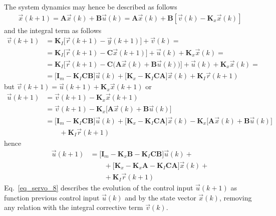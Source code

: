 \documentclass[12pt,a4paper,oneside]{book}
\begin{document}
\begin{onehalfspace}
The system dynamics may hence be described as follows
\begin{equation}\label{eq_servo_6}
	\begin{aligned}
		\vec{x}(k+1) = \mathbf{A}\vec{x}(k)+\mathbf{B}\vec{u}(k) = 
		\mathbf{A}\vec{x}(k)+\mathbf{B}\left[ 
		\vec{v}(k)-\mathbf{K}_x\vec{x}(k)\right] 
	\end{aligned}
\end{equation}
and the integral term as follows
\begin{equation}\label{eq_servo_7}
	\begin{aligned}
		\vec{v}(k+1) &= 
		\mathbf{K}_I\Big[\vec{r}(k+1)-\vec{y}(k+1)\Big]+\vec{v}(k)= \\[6pt]  
		&= 
		\mathbf{K}_I\Big[\vec{r}(k+1)-\mathbf{C}\vec{x}(k+1)\Big]+\vec{u}(k)+\mathbf{K}_x\vec{x}(k)=
		\\[6pt]
		&= \mathbf{K}_I\Big[\vec{r}(k+1)-\mathbf{C} \Big( 
		\mathbf{A}\vec{x}(k)+\mathbf{B}\vec{u}(k) \Big)  
		\Big]+\vec{u}(k)+\mathbf{K}_x\vec{x}(k)= \\[6pt]
		&= \Big[\mathbf{I}_m - \mathbf{K}_I\mathbf{C}\mathbf{B} \Big] 
		\vec{u}(k) + \Big[\mathbf{K}_x 
		-\mathbf{K}_I\mathbf{C}\mathbf{A}\Big] \vec{x}(k) + 
		\mathbf{K}_I\vec{r}(k+1)
	\end{aligned}
\end{equation}
but $\vec{v}(k+1)=\vec{u}(k+1)+\mathbf{K}_x\vec{x}(k+1)$ or
\begin{equation}
	\begin{aligned}
		\vec{u}(k+1) &= \vec{v}(k+1) - \mathbf{K}_x\vec{x}(k+1)  \\[6pt]
		&= \vec{v}(k+1) - \mathbf{K}_x\Big[\mathbf{A}\vec{x}(k)+\mathbf{B}\vec{u}(k)\Big] \\[6pt]
		&= \Big[\mathbf{I}_m - \mathbf{K}_I\mathbf{C}\mathbf{B} \Big] 
		\vec{u}(k) + \Big[\mathbf{K}_x 
		-\mathbf{K}_I\mathbf{C}\mathbf{A}\Big] \vec{x}(k) - \mathbf{K}_x\Big[\mathbf{A}\vec{x}(k)+\mathbf{B}\vec{u}(k)\Big] \\[6pt]
		&\qquad+ \mathbf{K}_I\vec{r}(k+1)
	\end{aligned}
\end{equation}
hence 
\begin{equation}\label{eq_servo_8}
	\begin{aligned}
		\vec{u}(k+1) &= 
		\Big[\mathbf{I}_m-\mathbf{K}_x\mathbf{B}-\mathbf{K}_I\mathbf{C}\mathbf{B}
		\Big] \vec{u}(k) + \\[6pt]
		&\qquad+\Big[\mathbf{K}_x - 
		\mathbf{K}_x\mathbf{A}-\mathbf{K}_I\mathbf{C}\mathbf{A} \Big] 
		\vec{x}(k) + \\[6pt]
		&\qquad+  \mathbf{K}_I\vec{r}(k+1)
	\end{aligned}
\end{equation}
Eq.~\eqref{eq_servo_8} describes the evolution of the control input $\vec{u}(k+1)$ as function previous control input $\vec{u}(k)$ and by the state vector $\vec{x}(k)$, removing any relation with the integral corrective term $\vec{v}(k)$.


\end{onehalfspace}
\end{document}
